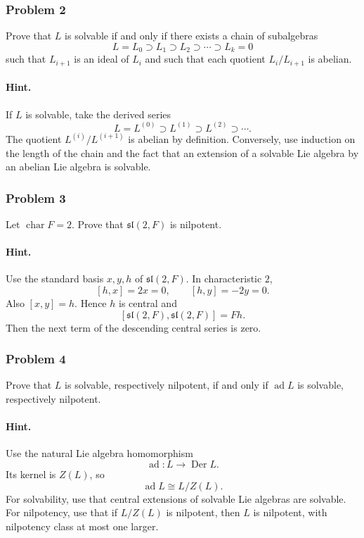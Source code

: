 \documentclass[12pt, a4paper]{article}
\begin{document}
\subsubsection{Problem 2}

Prove that \(L\) is solvable if and only if there exists a chain of subalgebras
\[
L=L_0 \supset L_1 \supset L_2 \supset \cdots \supset L_k=0
\]
such that \(L_{i+1}\) is an ideal of \(L_i\) and such that each quotient
\(L_i/L_{i+1}\) is abelian.

\paragraph{Hint.}
If \(L\) is solvable, take the derived series
\[
L=L^{(0)}\supset L^{(1)}\supset L^{(2)}\supset \cdots .
\]
The quotient \(L^{(i)}/L^{(i+1)}\) is abelian by definition. Conversely, use
induction on the length of the chain and the fact that an extension of a
solvable Lie algebra by an abelian Lie algebra is solvable.

\subsubsection{Problem 3}

Let \(\operatorname{char}F=2\). Prove that \(\mathfrak{sl}(2,F)\) is
nilpotent.

\paragraph{Hint.}
Use the standard basis \(x,y,h\) of \(\mathfrak{sl}(2,F)\). In characteristic
\(2\),
\[
[h,x]=2x=0,\qquad [h,y]=-2y=0.
\]
Also \([x,y]=h\). Hence \(h\) is central and
\[
[\mathfrak{sl}(2,F),\mathfrak{sl}(2,F)]=Fh.
\]
Then the next term of the descending central series is zero.

\subsubsection{Problem 4}

Prove that \(L\) is solvable, respectively nilpotent, if and only if
\(\operatorname{ad}L\) is solvable, respectively nilpotent.

\paragraph{Hint.}
Use the natural Lie algebra homomorphism
\[
\operatorname{ad}:L\to \operatorname{Der}L.
\]
Its kernel is \(Z(L)\), so
\[
\operatorname{ad}L\cong L/Z(L).
\]
For solvability, use that central extensions of solvable Lie algebras are
solvable. For nilpotency, use that if \(L/Z(L)\) is nilpotent, then \(L\) is
nilpotent, with nilpotency class at most one larger.
\end{document}
